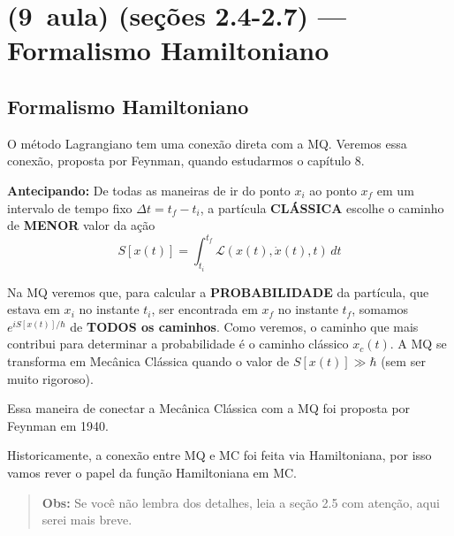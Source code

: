 \section*{(9\textordfeminine\ aula) (seções 2.4-2.7) --- Formalismo Hamiltoniano}

\subsection*{Formalismo Hamiltoniano}

O método Lagrangiano tem uma conexão direta com a MQ. Veremos essa conexão, proposta por Feynman, quando estudarmos o capítulo 8.

\textbf{Antecipando:} De todas as maneiras de ir do ponto $x_i$ ao ponto $x_f$ em um intervalo de tempo fixo $\Delta t = t_f - t_i$, a partícula \textbf{CLÁSSICA} escolhe o caminho de \textbf{MENOR} valor da ação
\begin{equation}
    S[x(t)] = \int_{t_i}^{t_f} \mathcal{L}(x(t), \dot{x}(t), t) \, dt
\label{eq:aula9_acao}
\end{equation}

\begin{center}
\end{center}

Na MQ veremos que, para calcular a \textbf{PROBABILIDADE} da partícula, que estava em $x_i$ no instante $t_i$, ser encontrada em $x_f$ no instante $t_f$, somamos $e^{iS[x(t)]/\hbar}$ de \textbf{TODOS os caminhos}. Como veremos, o caminho que mais contribui para determinar a probabilidade é o caminho clássico $x_c(t)$. A MQ se transforma em Mecânica Clássica quando o valor de $S[x(t)] \gg \hbar$ (sem ser muito rigoroso).

Essa maneira de conectar a Mecânica Clássica com a MQ foi proposta por Feynman em 1940.

Historicamente, a conexão entre MQ e MC foi feita via Hamiltoniana, por isso vamos rever o papel da função Hamiltoniana em MC.

\begin{quote}
\textbf{Obs:} Se você não lembra dos detalhes, leia a seção 2.5 com atenção, aqui serei mais breve.
\end{quote}


